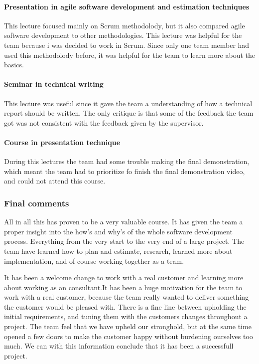 \paragraph{Presentation in agile software development and estimation techniques}
This lecture focused mainly on Scrum methodolody, but it also compared agile software development to other methodologies. This lecture was helpful for the team because i was decided to work in Scrum. Since only one team member had used this methodolody before, it was helpful for the team to learn more about the basics. 

\paragraph{Seminar in technical writing}
This lecture was useful since it gave the team a understanding of how a technical report should be written. The only critique is that some of the feedback the team got was not consistent with the feedback given by the supervisor.

\paragraph{Course in presentation technique}
During this lectures the team had some trouble making the final demonstration, which meant the team had to prioritize fo finish the final demonstration video, and could not attend this course.

\subsubsection{Final comments}

All in all this has proven to be a very valuable course. It has given the team a proper insight into the how’s and why’s of the whole software development process. Everything from the very start to the very end of a large project. The team have learned how to plan and estimate, research, learned more about implementation, and of course working together as a team. 

It has been a welcome change to work with a real customer and learning more about working as an consultant.It has been a huge motivation for the team to work with a real customer, because the team really wanted to deliver something the customer would be pleased with. There is a ﬁne line between upholding the initial requirements, and tuning them with the customers changes throughout a project. The team feel that we have upheld our stronghold, but at the same time opened a few doors to
make the customer happy without burdening ourselves too much. We can with this information
conclude that it has been a successfull project.

